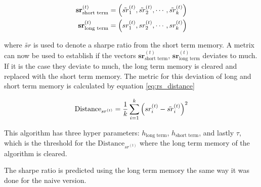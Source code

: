 \begin{align}
    \mathbf{sr}^{(t)}_{\text{short term}} &= \left( \tilde{sr}_1^{(t)}, \tilde{sr}_2^{(t)}, \cdots , \tilde{sr}_k^{(t)}\right) \\
    \mathbf{sr}^{(t)}_{\text{long term}} &= \left( sr_1^{(t)}, sr_2^{(t)}, \cdots , sr_k^{(t)}\right)
\end{align}

where $\tilde{sr}$ is used to denote a sharpe ratio from the short term memory. A metrix can now be used to establish if the vectors $ \mathbf{sr}^{(t)}_{\text{short term}}$,  $ \mathbf{sr}^{(t)}_{\text{long term}}$ deviates to much. If it is the case they deviate to much, the long term memory is cleared and replaced  with the short term memory. The metric for this deviation of long and short term memory is calculated by equation \ref{eq:rs_distance}

\begin{equation}\label{eq:rs_distance}
    \text{Distance}_{sr^{(t)}} = \frac{1}{k}\sum_{i=1}^{k} \left( sr^{(t)}_{i} - \tilde{sr}^{(t)}_{i} \right)^{2}
\end{equation}

This algorithm has three hyper parameters: $h_{\text{long term}}$, $h_{\text{short term}}$, and lastly $\tau$, which is the threshold for the $\text{Distance}_{sr^{(t)}}$ where the long term memory of the algorithm is cleared.

The sharpe ratio is predicted using the long term memory the same way it was done for the naive version.

